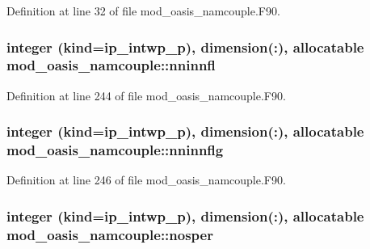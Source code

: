Definition at line 32 of file mod\+\_\+oasis\+\_\+namcouple.\+F90.

\hypertarget{classmod__oasis__namcouple_a579387e570e26f2d6c6c2159824cf8a3}{
\subsubsection[{nninnfl}]{\setlength{\rightskip}{0pt plus 5cm}integer (kind=ip\+\_\+intwp\+\_\+p), dimension(\+:), allocatable mod\+\_\+oasis\+\_\+namcouple\+::nninnfl\hspace{0.3cm}{\ttfamily [private]}}}\label{classmod__oasis__namcouple_a579387e570e26f2d6c6c2159824cf8a3}


Definition at line 244 of file mod\+\_\+oasis\+\_\+namcouple.\+F90.

\hypertarget{classmod__oasis__namcouple_a6526a92cd5fa662f9da229806d062dc2}{
\subsubsection[{nninnflg}]{\setlength{\rightskip}{0pt plus 5cm}integer (kind=ip\+\_\+intwp\+\_\+p), dimension(\+:), allocatable mod\+\_\+oasis\+\_\+namcouple\+::nninnflg\hspace{0.3cm}{\ttfamily [private]}}}\label{classmod__oasis__namcouple_a6526a92cd5fa662f9da229806d062dc2}


Definition at line 246 of file mod\+\_\+oasis\+\_\+namcouple.\+F90.

\hypertarget{classmod__oasis__namcouple_a484a71c213c89416924a0e23cfd46269}{
\subsubsection[{nosper}]{\setlength{\rightskip}{0pt plus 5cm}integer (kind=ip\+\_\+intwp\+\_\+p), dimension(\+:), allocatable mod\+\_\+oasis\+\_\+namcouple\+::nosper\hspace{0.3cm}{\ttfamily [private]}}}\label{classmod__oasis__namcouple_a484a71c213c89416924a0e23cfd46269}


